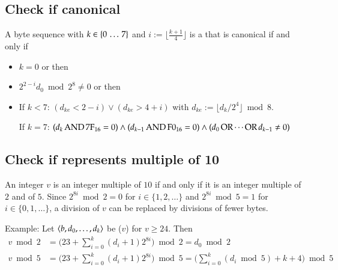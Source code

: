 \subsection{Check if canonical \DborBinaryRationalValue}
\label{sec:implementation:BinaryRationalValue:canonical}

A byte sequence  with
$k \in \{0 \,\ldots\, 7\}$ and $i := \lfloor \frac{k + 1}{4} \rfloor$
is a \DborBinaryRationalValue{} that is canonical if and only if
\begin{itemize}
    \item
    $k = 0$ or then

    \item
    $2^{2 - i} d_0 \bmod 2^8 \ne 0$ or then

    \item
    If $k < 7$:
    $(d_{ke} < 2 - i) \vee (d_{ke} > 4 + i)$
    with $d_{ke} := \lfloor d_k / 2^4 \rfloor \bmod 8$.

    If $k = 7$:
    $(d_k \operatorname{AND} \mathrm{7F}_{16} = 0) \wedge (d_{k - 1} \operatorname{AND} \mathrm{F0}_{16} = 0)
    \wedge (d_0 \operatorname{OR} \cdots \operatorname{OR} d_{k - 1} \ne 0)$
\end{itemize}


\subsection{Check if \DborIntegerValue{} represents multiple of 10}
\label{sec:implementation:IntegerValue:mod10}

An integer $v$ is an integer multiple of $10$ if and only if it is an integer multiple
of $2$ and of $5$.
Since $2^{8i} \bmod 2 = 0$ for $i \in \{1, 2, \ldots\}$
and $2^{8i} \bmod 5 = 1$ for $i \in \{0, 1, \ldots\}$,
a division of $v$ can be replaced by divisions of fewer bytes.

Example:
Let $\langle  b, d_0, \ldots, d_k \rangle$ be \DborIntegerValue($v$) for $v \ge 24$.
Then
\begin{align*}
    v \bmod 2
        & = \big(23 + \sum_{i = 0}^k (d_i + 1) 2^{8 i}\big) \bmod 2
        = d_0 \bmod 2 \\
    v \bmod 5
        & = \big(23 + \sum_{i = 0}^k (d_i + 1) 2^{8 i}\big) \bmod 5
        = \big(\sum_{i = 0}^k (d_i \bmod 5) + k + 4\big) \bmod 5
\end{align*}
